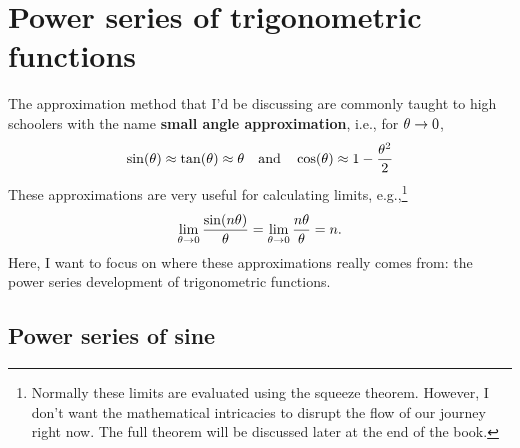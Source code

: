 \section{Power series of trigonometric functions}

The approximation method that I'd be discussing are commonly taught to high schoolers with the name \textbf{small angle approximation}, i.e., for \(\theta \rightarrow 0\), 
\begin{gather}
  \sin(\theta) \approx \tan(\theta) \approx \theta \quad\textrm{and}\quad \cos(\theta) \approx 1 - \frac{\theta^2}{2}
\end{gather}
These approximations are very useful for calculating limits, e.g.,\footnote{Normally these limits are evaluated using the squeeze theorem. However, I don't want the mathematical intricacies to disrupt the flow of our journey right now. The full theorem will be discussed later at the end of the book.}
\begin{equation}
  \lim_{\theta \rightarrow 0}\frac{\sin(n\theta)}{\theta} = \lim_{\theta \rightarrow 0}\frac{n\theta}{\theta} = n.
\end{equation}
Here, I want to focus on where these approximations really comes from: the power series development of trigonometric functions.

\subsection{Power series of sine}

